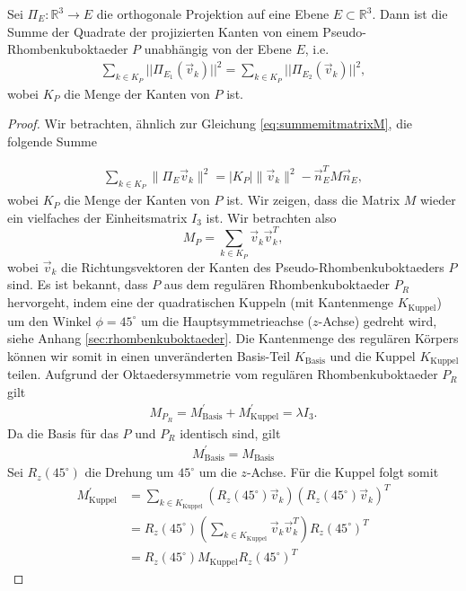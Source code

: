 \begin{proposition}
    Sei $\Pi_{E}:\mathbb{R}^3 \rightarrow E$ die orthogonale Projektion auf eine Ebene $E \subset \mathbb{R}^3$. Dann ist die Summe der Quadrate der projizierten Kanten von einem Pseudo-Rhombenkuboktaeder $P$ unabhängig von der Ebene $E$, i.e. 
    \begin{align}
        \sum_{k \in K_{P}} ||\Pi_{E_1}(\vec{v}_k)||^2 = \sum_{k \in K_P} ||\Pi_{E_2}(\vec{v}_k)||^2,
    \end{align}
    wobei $K_{P}$ die Menge der Kanten von $P$ ist.
\end{proposition}
\begin{proof}
    Wir betrachten, ähnlich zur Gleichung \eqref{eq:summemitmatrixM}, die folgende Summe
    
    \begin{align}
        \sum_{k \in K_P} \|\Pi_{E}\vec{v}_k\|^2 = |K_P|  \|\vec{v}_k\|^2 - \vec{n}_E^T M \vec{n}_E, \nonumber 
    \end{align}
    wobei $K_P$ die Menge der Kanten von $P$ ist. Wir zeigen, dass die Matrix $M$ wieder ein vielfaches der Einheitsmatrix $I_3$ ist. Wir betrachten also     $$M_P = \sum_{k \in K_P} \vec{v}_k \vec{v}_k^T,$$ wobei $\vec{v}_k$ die Richtungsvektoren der Kanten des Pseudo-Rhombenkuboktaeders $P$ sind. Es ist bekannt, dass $P$ aus dem regulären Rhombenkuboktaeder $P_R$ hervorgeht, indem eine der quadratischen Kuppeln (mit Kantenmenge $K_{\text{Kuppel}}$) um den Winkel $\phi = 45^\circ$ um die Hauptsymmetrieachse ($z$-Achse) gedreht wird, siehe Anhang \ref{sec:rhombenkuboktaeder}. Die Kantenmenge des regulären Körpers können wir somit in einen unveränderten Basis-Teil $K_{\text{Basis}}$ und die Kuppel $K_{\text{Kuppel}}$ teilen. Aufgrund der Oktaedersymmetrie vom regulären Rhombenkuboktaeder $P_R$ gilt
    \begin{align}
        M_{P_R} = M^{'}_{\text{Basis}} + M^{'}_{\text{Kuppel}} = \lambda I_3 . \nonumber
    \end{align}
    Da die Basis für das $P$ und $P_R$ identisch sind, gilt
\begin{align}
        M^{'}_{\text{Basis}} = M_{\text{Basis}} \nonumber
    \end{align}
    Sei $R_z(45^\circ)$ die Drehung um $45^\circ$ um die $z$-Achse. Für die Kuppel folgt somit
    \begin{align}
        M^{'}_{\text{Kuppel}} &= \sum_{k \in K_{\text{Kuppel}}} \left(R_z(45^\circ)\vec{v}_k\right) \left(R_z(45^\circ)\vec{v}_k\right)^T \nonumber \\
        &= R_z(45^\circ) \left(\sum_{k \in K_{\text{Kuppel}}} \vec{v}_k \vec{v}_k^T \right) R_z(45^\circ)^T \nonumber \\
        &=R_z(45^\circ) M_{\text{Kuppel}} R_z(45^\circ)^T \nonumber
    \end{align}


\end{proof}
